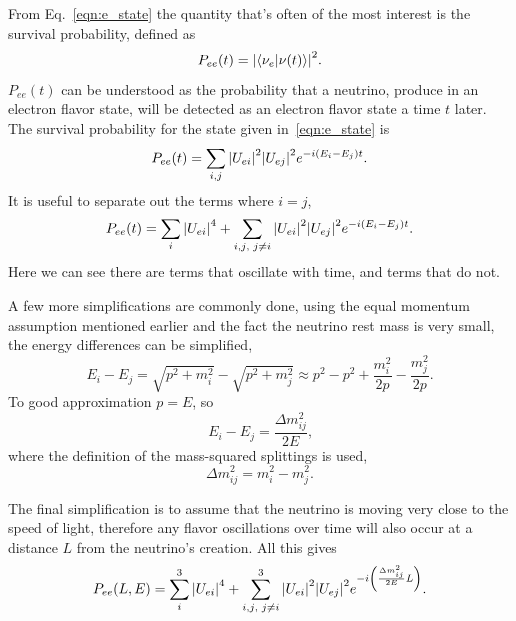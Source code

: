 From Eq.~\eqref{eqn:e_state} the quantity that's often of the most interest
is the survival probability, defined as
\begin{equation}
    P_{ee}(t) = \abs{\braket{\nu_{e}}{\nu(t)}}^{2}\text{.}
\end{equation}
$P_{ee}(t)$ can be understood as the probability that a neutrino, produce in
an electron flavor state, will be detected as an electron flavor state a time
$t$ later.
The survival probability for the state given in~\eqref{eqn:e_state} is
\begin{equation}
    P_{ee}(t) = \sum_{i,j}\abs{U_{ei}}^2\abs{U_{ej}}^2e^{-i(E_{i} - E_{j})t}\text{.}
\end{equation}
It is useful to separate out the terms where $i=j$,
\begin{equation}
    P_{ee}(t) = \sum_{i}\abs{U_{ei}}^4 + \sum_{i,j\text{, }j \ne i}
    \abs{U_{ei}}^2\abs{U_{ej}}^2e^{-i(E_{i} - E_{j})t}\text{.}
\end{equation}
Here we can see there are terms that oscillate with time, and terms that do
not.

A few more simplifications are commonly done, using the equal momentum
assumption mentioned earlier and the fact the neutrino rest mass is
very small, the energy differences can be simplified,
\begin{equation}
    E_{i} - E_{j} = \sqrt{p^{2} + m_{i}^{2}} - \sqrt{p^{2} + m_{j}^{2}} \approx
    p^{2} - p^{2} + \frac{m_{i}^2}{2p} - \frac{m_{j}^2}{2p}\text{.}
\end{equation}
To good approximation $p=E$, so
\begin{equation}
    E_{i} - E_{j} = \frac{\Delta m^{2}_{ij}}{2E}\text{,}
\end{equation}
where the definition of the mass-squared splittings is used,
\begin{equation}
    \Delta m^{2}_{ij} = m^{2}_{i} - m^{2}_{j}\text{.}
\end{equation}

The final simplification is to assume that the neutrino is moving very close
to the speed of light, therefore any flavor oscillations over time will also
occur at a distance $L$ from the neutrino's creation.
All this gives
\begin{equation}
    \label{eqn:pee_adiabatic}
    P_{ee}(L,E) = \sum_{i}^{3}\abs{U_{ei}}^4 +
    \sum_{i,j\text{, }j \ne i}^{3}
    \abs{U_{ei}}^2\abs{U_{ej}}^2e^{-i\left(\frac{\Delta m^{2}_{ij}}{2E}L\right)}\text{.}
\end{equation}

